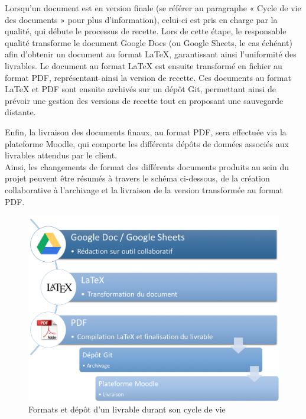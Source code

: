 Lorsqu’un document est en version finale (se référer au paragraphe « Cycle de vie des documents » pour plus d’information), celui-ci est pris en charge par la qualité, qui débute le processus de recette. Lors de cette étape, le responsable qualité transforme le document Google Docs (ou Google Sheets, le cas échéant) afin d’obtenir un document au format LaTeX, garantissant ainsi l’uniformité des livrables. Le document au format LaTeX est ensuite transformé en fichier au format PDF, représentant ainsi la version de recette. Ces documents au format LaTeX et PDF sont ensuite archivés sur un dépôt Git, permettant ainsi de prévoir une gestion des versions de recette tout en proposant une sauvegarde distante.

Enfin, la livraison des documents finaux, au format PDF, sera effectuée via la plateforme Moodle, qui comporte les différents dépôts de données associés aux livrables attendus par le client. \\

Ainsi, les changements de format des différents documents produits au sein du projet peuvent être résumés à travers le schéma ci-dessous, de la création collaborative à l’archivage et la livraison de la version transformée au format PDF.

\begin{figure}[H]
    \centering
    \label{fig-conversion}
    \includegraphics[scale=0.5]{figures/conversion.png}
    \caption{Formats et dépôt d’un livrable durant son cycle de vie}
\end{figure}